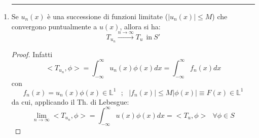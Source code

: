 \documentclass[twoside]{article}
\begin{document}
\begin{enumerate}
     \begin{equation}
         |u_n(x)|\le F(x) \ \in \mathds{L}^1 \ \ \forall n
     \end{equation}
    allora si ha:
    \begin{equation}
        T_{u_{n}} \xrightarrow{n\to \infty} T_u \ \ \text{in} \ S'
    \end{equation}
     \begin{proof}
     Si ha:
     \begin{equation}
         <T_{u_{n}},\phi>=\int_{-\infty}^{\infty}u_n(x)\phi(x) dx =\int_{-\infty}^{\infty}f_n(x) dx 
     \end{equation}
     dove 
     \begin{equation}
         f_n(x)=u_n(x)\phi(x)\ (\in \mathds{L}^1) \ \xrightarrow{n\to \infty} \ f(x)=u(x)\phi(x) \ \ [q.o.]
     \end{equation}
     e inoltre risulta:
     \begin{equation}
         |f_n(x)|=|u_n(x)||\phi(x)| \ \le \ \sup_{x\in\mathds{R}}|\phi(x)|F(x) \ \in \mathds{L}^1
     \end{equation}
     Da cui è possibile applicare il teorema di Lebesgue:
     \begin{equation}
         \begin{split}
             \lim_{n\to \infty} <T_{u_{n}},\phi> =\lim_{n\to \infty}\int_{-\infty}^{\infty}f_n(x)dx=\int_{-\infty}^{\infty}\lim_{n\to \infty}f_n(x) dx= \\
             =\int_{-\infty}^{\infty}f(x)dx=\int_{-\infty}^{\infty}u(x)\phi(x)dx=<T_u,\phi> \ \ \ \forall \phi \in S
         \end{split}
     \end{equation}
     
     \end{proof}
     
     \item
      \rule{\textwidth}{0.7pt}
     Se $u_n(x)$ è una successione di funzioni limitate ($|u_n(x)|\le M$) che convergono puntualmente a $u(x)$, allora si ha:
     \begin{equation}
         T_{u_n}\xrightarrow{n \to \infty} T_u \ \ \text{in} \ S'
     \end{equation}
     \begin{proof}
     Infatti
     \begin{equation}
         <T_{u_{n}},\phi>=\int_{-\infty}^{\infty}u_n(x)\phi(x)dx=\int_{-\infty}^{\infty} f_n(x)dx
     \end{equation}
     con
     \begin{equation}
         f_n(x)=u_n(x)\phi(x) \in \mathds{L}^1 \ \ \ ; \ \ \ |f_n(x)|\le M |\phi(x)| \equiv F(x) \in \mathds{L}^1
     \end{equation}
     da cui, applicando il Th. di Lebesgue:
     \begin{equation}
         \lim_{n\to \infty}<T_{u_{n}},\phi>=\int_{-\infty}^{\infty} u(x)\phi(x)dx=<T_u,\phi> \ \ \ \forall \phi \in S
     \end{equation}
     

\end{proof}
\end{enumerate}
\end{document}
